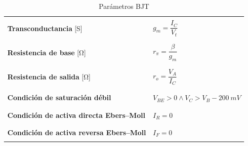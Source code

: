 \documentclass[11pt]{article}
\begin{document}
\begin{table}
\begin{tabular}{|p{7cm}|l|}
		                                                              &                                             \\
		\textbf{Transconductancia} [\si{\siemens}]                    & $g_m = \dfrac{I_C}{V_t}$                    \\
		                                                              &                                             \\
		\hline
		                                                              &                                             \\
		\textbf{Resistencia de base} [\si{\ohm}]                      & $r_\pi = \dfrac{\beta}{g_m}$                \\
		                                                              &                                             \\
		\hline
		                                                              &                                             \\
		\textbf{Resistencia de salida} [\si{\ohm}]                    & $r_o = \dfrac{V_A}{I_C}$                    \\
		                                                              &                                             \\
		\hline
		                                                              &                                             \\
		\textbf{Condición de saturación débil}                        & $V_{BE} > 0 \land V_C > V_B - \SI{200}{mV}$ \\
		                                                              &                                             \\
		\hline
		                                                              &                                             \\
		\textbf{Condición de activa directa Ebers--Moll}              & $I_R = 0$                                   \\
		                                                              &                                             \\
		\hline
		                                                              &                                             \\
		\textbf{Condición de activa reversa Ebers--Moll}              & $I_F = 0$                                   \\
		                                                              &                                             \\
		\hline
	\end{tabular}
	\caption{Parámetros BJT}
\end{table}
\end{document}
